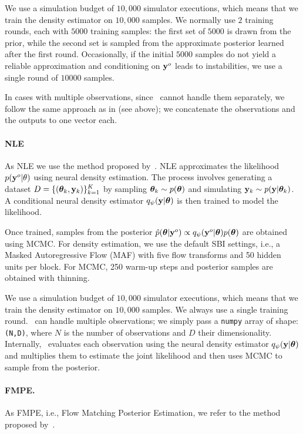 We use a simulation budget of $10,000$ simulator executions, which means that we train the density estimator on $10,000$ samples.
We normally use $2$ training rounds, each with $5000$ training samples: the first set of $5000$ is drawn from the prior, while the second set is sampled from the approximate posterior learned after the first round. Occasionally, if the initial $5000$ samples do not yield a reliable approximation and conditioning on $\mathbf{y}^o$ leads to instabilities, we use a single round of $10000$ samples.

In cases with multiple observations, since \NPE~cannot handle them separately, we follow the same approach as in \nromc (see above); we concatenate the observations and the outputs to one vector each.

\paragraph{NLE}

As NLE we use the method proposed by~\cite{papamakarios2019sequential}.
NLE approximates the likelihood \( p(\mathbf{y}^o|\theta) \) using neural density estimation. The process involves generating a dataset \( D = \{(\boldsymbol{\theta}_k, \mathbf{y}_k)\}_{k=1}^K \) by sampling \( \boldsymbol{\theta}_k \sim p(\boldsymbol{\theta}) \) and simulating \( \mathbf{y}_k \sim p(\mathbf{y}|\boldsymbol{\theta}_k) \). A conditional neural density estimator \( q_\psi(\mathbf{y}|\boldsymbol{\theta}) \) is then trained to model the likelihood.

Once trained, samples from the posterior \( \hat{p}(\boldsymbol{\theta}|\mathbf{y}^o) \propto q_\psi(\mathbf{y}^o|\boldsymbol{\theta}) p(\boldsymbol{\theta}) \) are obtained using MCMC.
For density estimation, we use the default SBI settings, i.e., a Masked Autoregressive Flow (MAF) with five flow transforms and 50 hidden units per block. For MCMC, 250 warm-up steps and posterior samples are obtained with thinning.

We use a simulation budget of $10,000$ simulator executions, which means that we train the density estimator on $10,000$ samples. We always use a single training round.
\NLE~can handle multiple observations; we simply pass a \texttt{numpy} array of shape: \texttt{(N,D)}, where $N$ is the number of observations and $D$ their dimensionality. Internally, \NLE~evaluates each observation using the neural density estimator $ q_\psi(\mathbf{y}|\boldsymbol{\theta}) $ and multiplies them to estimate the joint likelihood and then uses MCMC to sample from the posterior.

\paragraph{FMPE.} As FMPE, i.e., Flow Matching Posterior Estimation, we refer to the method proposed by~\cite{wildberger2023flow}. 

